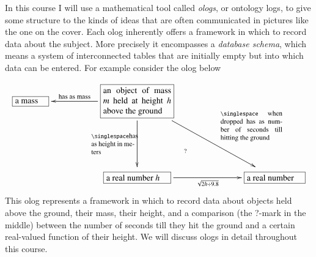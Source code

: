 \documentclass{book}
\def\tn{\textnormal}
\newcommand{\LA}[2]{\ar[#1]^-{\tn {#2}}}
\newcommand{\LAL}[2]{\ar[#1]_-{\tn {#2}}}
\newcommand{\obox}[3]{\stackrel{#1}{\fbox{\parbox{#2}{#3}}}}
\theoremstyle{theoremENG}
\theoremstyle{lemmaENG}
\theoremstyle{propositionENG}
\theoremstyle{corollaryENG}
\theoremstyle{factENG}
\theoremstyle{remarkENG}
\theoremstyle{exampleENG}
\theoremstyle{warningENG}
\theoremstyle{questionENG}
\theoremstyle{guessENG}
\theoremstyle{answerENG}
\theoremstyle{constructionENG}
\theoremstyle{rulesENG}
\theoremstyle{excENG}
\theoremstyle{appENG}
\theoremstyle{definitionENG}
\theoremstyle{notationENG}
\theoremstyle{conjectureENG}
\theoremstyle{postulateENG}
\theoremstyle{theoremRUS}
\theoremstyle{lemmaRUS}
\theoremstyle{propositionRUS}
\theoremstyle{corollaryRUS}
\theoremstyle{factRUS}
\theoremstyle{remarkRUS}
\theoremstyle{exampleRUS}
\theoremstyle{warningRUS}
\theoremstyle{questionRUS}
\theoremstyle{guessRUS}
\theoremstyle{answerRUS}
\theoremstyle{constructionRUS}
\theoremstyle{rulesRUS}
\theoremstyle{excRUS}
\theoremstyle{appRUS}
\theoremstyle{definitionRUS}
\theoremstyle{notationRUS}
\theoremstyle{conjectureRUS}
\theoremstyle{postulateRUS}
\begin{document}
\begin{english}
In this course I will use a mathematical tool called {\em ologs}, or ontology logs, to give some structure to the kinds of ideas that are often communicated in pictures like the one on the cover. Each olog inherently offers a framework in which to record data about the subject. More precisely it encompasses a {\em database schema}, which means a system of interconnected tables that are initially empty but into which data can be entered. For example consider the olog below
$$\xymatrix{
\obox{}{.5in}{a mass}&&\obox{}{1.1in}{an object of mass $m$ held at height $h$ above the ground}\LAL{ll}{\footnotesize has as mass}\LA{rrdd}{\hspace{.4in}\parbox{1in}{\singlespace \footnotesize when dropped has as number of seconds till hitting the ground}}\LAL{dd}{\parbox{.7in}{\singlespace\footnotesize has as height in meters}}&&\\\\
&&\obox{}{1in}{a real number $h$}\ar@{}[uurr]|(.35){?}\ar[rr]_-{\sqrt{2h\div 9.8}}&\hspace{.3in}&\obox{}{.9in}{a real number}
}
$$
This olog represents a framework in which to record data about objects held above the ground, their mass, their height, and a comparison (the ?-mark in the middle) between the number of seconds till they hit the ground and a certain real-valued function of their height. We will discuss ologs in detail throughout this course.


\end{english}
\end{document}
